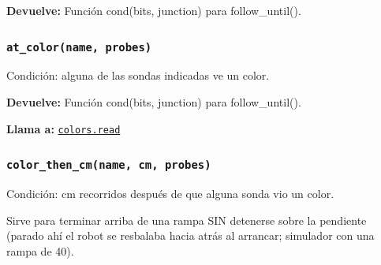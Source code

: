 \par{}\par\smallskip
\noindent\textbf{Devuelve:} Función cond(bits, junction) para follow\_until().\par

\subsubsection{\texttt{at\_\allowbreak{}color(name, probes)}}\label{fn:linefollow:at-color}
\noindent Condición: alguna de las sondas indicadas ve un color.

\par{}\par\smallskip
\noindent\textbf{Devuelve:} Función cond(bits, junction) para follow\_until().\par
\noindent\textbf{Llama a:} \hyperref[fn:colors:read]{\texttt{colors.read}}\par

\subsubsection{\texttt{color\_\allowbreak{}then\_\allowbreak{}cm(name, cm, probes)}}\label{fn:linefollow:color-then-cm}
\noindent Condición: cm recorridos después de que alguna sonda vio un color.

Sirve para terminar arriba de una rampa SIN detenerse sobre la pendiente (parado ahí el robot se resbalaba hacia atrás al arrancar; simulador con una rampa de 40\textdegree{}).

